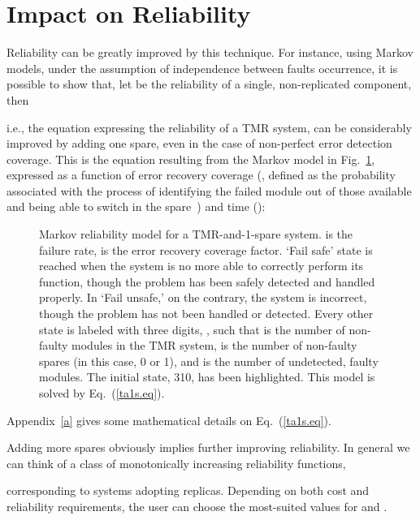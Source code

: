 \documentclass[11pt]{article}
\begin{document}
\section{Impact on Reliability}\label{ior}
Reliability can be greatly improved by this technique. For instance,
using Markov models, under the assumption of independence between faults occurrence,
it is possible to show that, let  be the reliability
of a single, non-replicated component, then

i.e., the equation expressing the reliability of a TMR system, can be
considerably improved by adding one spare, even in the case of non-perfect
error detection coverage. 
This is the equation resulting from the Markov model in 
Fig.~\ref{markov}, expressed as a function of error recovery coverage (,
defined as the probability associated with the process of identifying the failed module
out of those available and being able to switch in the spare~\cite{John89a}) and time ():

\begin{figure}
\centerline{}
\caption{Markov reliability model for a TMR-and-1-spare system.  is the failure rate,  is
the error recovery coverage factor.
`Fail safe' state is
reached when the system is no more able to correctly perform its function, though the problem has been 
safely detected and handled properly. In `Fail unsafe,' on the contrary, the system is incorrect, though
the problem has not been handled or detected. 
Every other state is labeled with three digits, , such that
 is the number of non-faulty modules in the TMR system,  is the number of non-faulty spares
(in this case, 0 or 1), and  is the number of undetected, faulty modules. The
initial state, 310, has been highlighted. 
This model is solved by Eq.~(\ref{ta1s.eq}).}
\label{markov}
\end{figure}



\noindent
Appendix~\ref{a} gives some mathematical details on Eq.~(\ref{ta1s.eq}).

Adding more spares obviously implies further improving reliability. In general
we can think of a class of monotonically increasing reliability functions,

corresponding to systems adopting  replicas.
Depending on both cost and reliability requirements,
the user can choose the most-suited values for  and .
\end{document}
